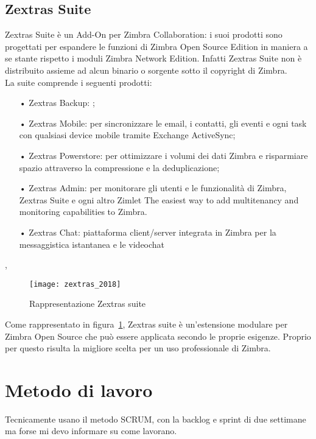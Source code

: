\subsection{Zextras Suite}
Zextras Suite è un Add-On per Zimbra Collaboration: i suoi prodotti sono progettati per espandere le funzioni di Zimbra Open Source Edition in maniera a se stante rispetto i moduli Zimbra Network Edition. Infatti Zextras Suite non è distribuito assieme ad alcun binario o sorgente sotto il copyright di Zimbra. \\
La suite comprende i seguenti prodotti:
	\begin{itemize}
		\item[•] Zextras Backup: ;
		\item[•] Zextras Mobile: per sincronizzare le email, i contatti, gli eventi e ogni task con qualsiasi device mobile tramite Exchange ActiveSync;
		\item[•] Zextras Powerstore: per ottimizzare i volumi dei dati Zimbra e risparmiare spazio attraverso la compressione e la deduplicazione;
		\item[•] Zextras Admin: per monitorare gli utenti e le funzionalità di Zimbra, Zextras Suite e ogni altro Zimlet
		The easiest way to add multitenancy and monitoring capabilities to Zimbra.
		\item[•] Zextras Chat:  piattaforma client/server integrata in Zimbra per la messaggistica istantanea e le videochat
	\end{itemize},

\begin{figure}[H] 
	\centering
	\texttt{[image: zextras\_2018]}
	\caption{Rappresentazione Zextras suite}
	\label{fig:modulizextras}
\end{figure}
Come rappresentato in figura~\ref{fig:modulizextras}, Zextras suite è un'estensione modulare per Zimbra Open Source che può essere applicata secondo le proprie esigenze. Proprio per questo risulta la migliore scelta per un uso professionale di Zimbra.

\section{Metodo di lavoro}
Tecnicamente usano il metodo SCRUM, con la backlog e sprint di due settimane ma forse mi devo informare su come lavorano. \\


